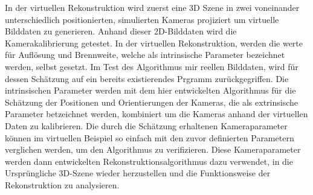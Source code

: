 In der virtuellen Rekonstruktion wird zuerst eine 3D Szene in zwei voneinander unterschiedlich positionierten, simulierten Kameras projiziert um virtuelle Bilddaten zu generieren. Anhand dieser 2D-Bilddaten wird die Kamerakalibrierung getestet. In der virtuellen Rekonstruktion, werden die werte für Auflösung und Brennweite, welche als intrinsische Parameter bezeichnet werden, selbst gesetzt. Im Test des Algorithmus mir reellen Bilddaten, wird für dessen Schätzung auf ein bereits existierendes Prgramm zurückgegriffen. Die intrinsischen Parameter werden mit dem hier entwickelten Algorithmus für die Schätzung der Positionen und Orientierungen der Kameras, die als extrinsische Parameter betzeichnet werden, kombiniert um die Kameras anhand der virtuellen Daten zu kalibrieren. Die durch die Schätzung erhaltenen Kameraparameter können im virtuellen Beispiel so einfach mit den zuvor definierten Parametern verglichen werden, um den Algorithmus zu verifizieren. Diese Kameraparameter werden dann entwickelten Rekonstruktionsalgorithmus dazu verwendet, in die Ursprüngliche 3D-Szene wieder herzustellen und die Funktionsweise der Rekonstruktion zu analysieren. \\



